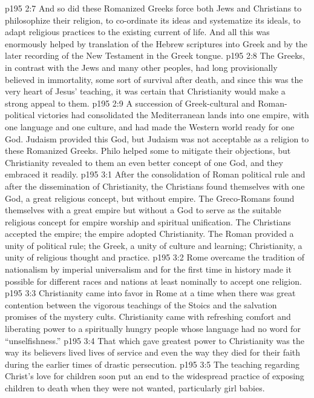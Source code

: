 \vs p195 2:7 And so did these Romanized Greeks force both Jews and Christians to philosophize their religion, to co\hyp{}ordinate its ideas and systematize its ideals, to adapt religious practices to the existing current of life. And all this was enormously helped by translation of the Hebrew scriptures into Greek and by the later recording of the New Testament in the Greek tongue.
\vs p195 2:8 The Greeks, in contrast with the Jews and many other peoples, had long provisionally believed in immortality, some sort of survival after death, and since this was the very heart of Jesus’ teaching, it was certain that Christianity would make a strong appeal to them.
\vs p195 2:9 A succession of Greek\hyp{}cultural and Roman\hyp{}political victories had consolidated the Mediterranean lands into one empire, with one language and one culture, and had made the Western world ready for one God. Judaism provided this God, but Judaism was not acceptable as a religion to these Romanized Greeks. Philo helped some to mitigate their objections, but Christianity revealed to them an even better concept of one God, and they embraced it readily.
\vs p195 3:1 After the consolidation of Roman political rule and after the dissemination of Christianity, the Christians found themselves with one God, a great religious concept, but without empire. The Greco\hyp{}Romans found themselves with a great empire but without a God to serve as the suitable religious concept for empire worship and spiritual unification. The Christians accepted the empire; the empire adopted Christianity. The Roman provided a unity of political rule; the Greek, a unity of culture and learning; Christianity, a unity of religious thought and practice.
\vs p195 3:2 Rome overcame the tradition of nationalism by imperial universalism and for the first time in history made it possible for different races and nations at least nominally to accept one religion.
\vs p195 3:3 Christianity came into favor in Rome at a time when there was great contention between the vigorous teachings of the Stoics and the salvation promises of the mystery cults. Christianity came with refreshing comfort and liberating power to a spiritually hungry people whose language had no word for “unselfishness.”
\pc \vs p195 3:4 That which gave greatest power to Christianity was the way its believers lived lives of service and even the way they died for their faith during the earlier times of drastic persecution.
\pc \vs p195 3:5 The teaching regarding Christ’s love for children soon put an end to the widespread practice of exposing children to death when they were not wanted, particularly girl babies.
